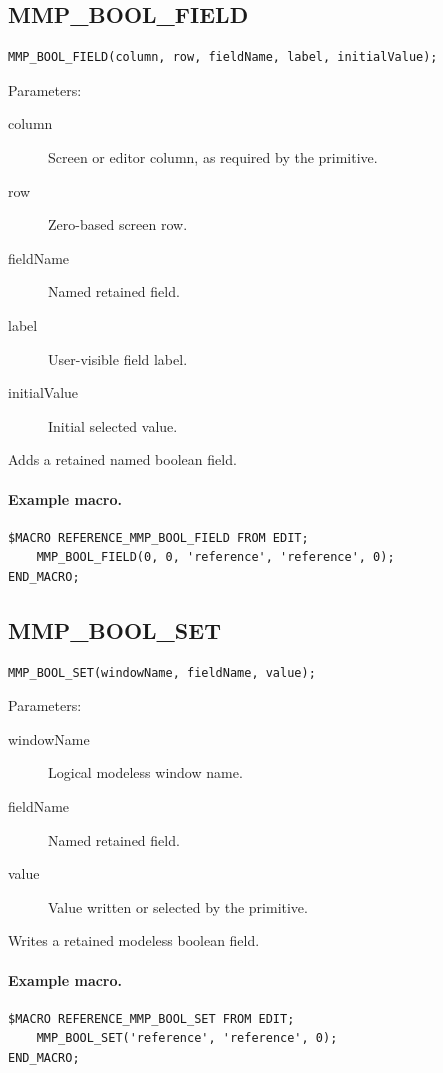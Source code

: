 \documentclass[a4paper,10pt,twoside,openany]{book}
\newenvironment{mrmacextension}{\begin{changebar}}{\end{changebar}}
\begin{document}
\begin{mrmacextension}
\label{prim:procedure-mmp-bool-field}
\subsection*{MMP\_BOOL\_FIELD}
\begin{verbatim}
MMP_BOOL_FIELD(column, row, fieldName, label, initialValue);
\end{verbatim}
Parameters:
\begin{description}
\item[column] Screen or editor column, as required by the primitive.
\item[row] Zero-based screen row.
\item[fieldName] Named retained field.
\item[label] User-visible field label.
\item[initialValue] Initial selected value.
\end{description}

Adds a retained named boolean field.

\paragraph{Example macro.}
\begin{verbatim}
$MACRO REFERENCE_MMP_BOOL_FIELD FROM EDIT;
    MMP_BOOL_FIELD(0, 0, 'reference', 'reference', 0);
END_MACRO;
\end{verbatim}
\end{mrmacextension}

\begin{mrmacextension}
\label{prim:procedure-mmp-bool-set}
\subsection*{MMP\_BOOL\_SET}
\begin{verbatim}
MMP_BOOL_SET(windowName, fieldName, value);
\end{verbatim}
Parameters:
\begin{description}
\item[windowName] Logical modeless window name.
\item[fieldName] Named retained field.
\item[value] Value written or selected by the primitive.
\end{description}

Writes a retained modeless boolean field.

\paragraph{Example macro.}
\begin{verbatim}
$MACRO REFERENCE_MMP_BOOL_SET FROM EDIT;
    MMP_BOOL_SET('reference', 'reference', 0);
END_MACRO;
\end{verbatim}
\end{mrmacextension}
\end{document}
